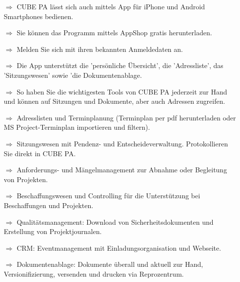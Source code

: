 \documentclass{article}
\begin{document}
\begin{multicols}{2}

\begin{tcolorbox}[colback=blue!5,colframe=blue!40!black,title=Mobile CUBE PA Version]
\begin{itemize}
  \item[$\Longrightarrow$] CUBE PA lässt sich auch mittels App für iPhone und Android Smartphones bedienen.
  \item[$\Longrightarrow$] Sie können das Programm mittels AppShop gratis herunterladen.
  \item[$\Longrightarrow$] Melden Sie sich mit ihren bekannten Anmeldedaten an.
  \item[$\Longrightarrow$] Die App unterstützt die 'persönliche Übersicht', die 'Adressliste', das 'Sitzungswesen' sowie 'die Dokumentenablage.
	\item[$\Longrightarrow$] So haben Sie die wichtigesten Tools von CUBE PA jederzeit zur Hand und können auf Sitzungen und Dokumente, aber auch Adressen zugreifen.
\end{itemize}
\begin{centering}
\end{centering}
\end{tcolorbox}


\begin{tcolorbox}[colback=blue!5,colframe=blue!40!black,title=Die verfügbaren Module von CUBE PA]
\begin{itemize}
  \item[$\Longrightarrow$] Adresslisten und Terminplanung (Terminplan per pdf herunterladen oder MS Project-Terminplan importieren und filtern).
  \item[$\Longrightarrow$] Sitzungswesen mit Pendenz- und Entscheideverwaltung. Protokollieren Sie direkt in CUBE PA.
	\item[$\Longrightarrow$] Anforderungs- und Mängelmanagement zur Abnahme oder Begleitung von Projekten.
	\item[$\Longrightarrow$] Beschaffungswesen und Controlling für die Unterstützung bei Beschaffungen und Projekten.
		\item[$\Longrightarrow$] Qualitätsmanagement: Download von Sicherheitsdokumenten und Erstellung von Projektjournalen.
		\item[$\Longrightarrow$] CRM: Eventmanagement mit Einladungsorganisation und Webseite.
		\item[$\Longrightarrow$] Dokumentenablage: Dokumente überall und aktuell zur Hand, Versionifizierung, versenden und drucken via Reprozentrum.
\end{itemize}
\end{tcolorbox}


\end{multicols}
\end{document}
